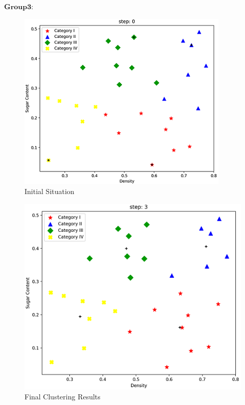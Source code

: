 \documentclass[homework]{IEEEtran}
\begin{document}
\begin{CJK}{UTF8}{gkai}
$\mathbf{Group 3}$:
\begin{figure}[htb]
    \centerline{\includegraphics{Images/fig21.png}}
    \caption{Initial Situation}
    \label{fig21}
    \end{figure} 
    \vspace{20mm}
\begin{figure}[htb]
    \centerline{\includegraphics{Images/fig22.png}}
    \caption{Final Clustering Results}
    \label{fig22}
    \end{figure} \par


\end{CJK}
\end{document}
